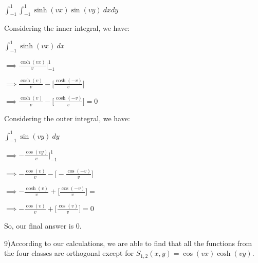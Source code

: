 \documentclass[executivepaper]{article}
\begin{document}
\begin{flushleft}
\begin{center}
$\int_{-1}^{1} \int_{-1}^{1} \sinh(vx)\sin(vy) \ dx dy$

\end{center}

Considering the inner integral, we have:

\begin{center}

$\int_{-1}^{1} \sinh(vx) \ dx$

\vspace{1mm}

$\implies \frac{\cosh(vx)}{v} \Big|_{-1}^{1}$

\vspace{1mm}

$\implies \frac{\cosh(v)}{v} - \bigg[\frac{\cosh(-v)}{v}\bigg]$

\vspace{1mm}

$\implies \frac{\cosh(v)}{v} - \bigg[\frac{\cosh(-v)}{v}\bigg]=0$

\end{center}

Considering the outer integral, we have:

\begin{center}

$\int_{-1}^{1} \sin(vy) \ dy$

\vspace{1mm}

$\implies -\frac{\cos(vy)}{v} \Big|_{-1}^{1}$

\vspace{1mm}

$\implies -\frac{\cos(v)}{v} - \bigg[-\frac{\cos(-v)}{v}\bigg]$

\vspace{1mm}

$\implies -\frac{\cosh(v)}{v} + \bigg[\frac{\cos(-v)}{v}\bigg]=$

\vspace{1mm}

$\implies -\frac{\cos(v)}{v} + \bigg[\frac{\cos(v)}{v}\bigg]=0$

\end{center}

So, our final answer is $0$.

\end{flushleft}

\begin{flushleft}

9)According to our calculations, we are able to find that all the functions from the four classes are orthogonal except for $S_{1,2}(x,y)=\cos(vx)\cosh(vy)$.

\end{flushleft}
\end{document}
